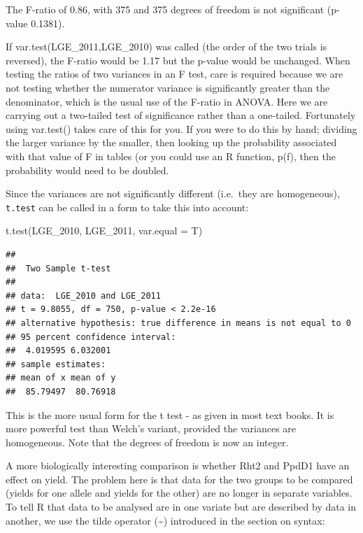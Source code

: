 \documentclass[
]{book}
\newenvironment{Shaded}{\begin{snugshade}}{\end{snugshade}}
\newcommand{\AttributeTok}[1]{\textcolor[rgb]{0.77,0.63,0.00}{#1}}
\newcommand{\FunctionTok}[1]{\textcolor[rgb]{0.00,0.00,0.00}{#1}}
\newcommand{\NormalTok}[1]{#1}
\begin{document}
The F-ratio of 0.86, with 375 and 375 degrees of freedom is not significant (p-value 0.1381).

If var.test(LGE\_2011,LGE\_2010) was called (the order of the two trials is reversed), the F-ratio would be 1.17 but the p-value would be unchanged. When testing the ratios of two variances in an F test, care is required because we are not testing whether the numerator variance is significantly greater than the denominator, which is the usual use of the F-ratio in ANOVA. Here we are carrying out a two-tailed test of significance rather than a one-tailed. Fortunately using var.test() takes care of this for you. If you were to do this by hand; dividing the larger variance by the smaller, then looking up the probability associated with that value of F in tables (or you could use an R function, p(f), then the probability would need to be doubled.

Since the variances are not significantly different (i.e.~they are homogeneous), \texttt{t.test} can be called in a form to take this into account:

\begin{Shaded}
\begin{Highlighting}[]
\FunctionTok{t.test}\NormalTok{(LGE\_2010, LGE\_2011, }\AttributeTok{var.equal =}\NormalTok{ T)}
\end{Highlighting}
\end{Shaded}

\begin{verbatim}
## 
##  Two Sample t-test
## 
## data:  LGE_2010 and LGE_2011
## t = 9.8055, df = 750, p-value < 2.2e-16
## alternative hypothesis: true difference in means is not equal to 0
## 95 percent confidence interval:
##  4.019595 6.032001
## sample estimates:
## mean of x mean of y 
##  85.79497  80.76918
\end{verbatim}

This is the more usual form for the t test - as given in most text books. It is more powerful test than Welch's variant, provided the variances are homogeneous. Note that the degrees of freedom is now an integer.

A more biologically interesting comparison is whether Rht2 and PpdD1 have an effect on yield. The problem here is that data for the two groups to be compared (yields for one allele and yields for the other) are no longer in separate variables. To tell R that data to be analysed are in one variate but are described by data in another, we use the tilde operator (\textasciitilde) introduced in the section on syntax:
\end{document}
